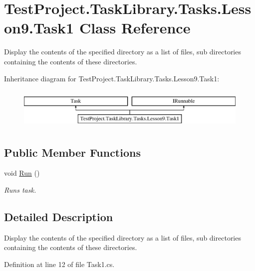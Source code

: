 \hypertarget{class_test_project_1_1_task_library_1_1_tasks_1_1_lesson9_1_1_task1}{}\section{Test\+Project.\+Task\+Library.\+Tasks.\+Lesson9.\+Task1 Class Reference}
\label{class_test_project_1_1_task_library_1_1_tasks_1_1_lesson9_1_1_task1}


Display the contents of the specified directory as a list of files, sub directories containing the contents of these directories.  


Inheritance diagram for Test\+Project.\+Task\+Library.\+Tasks.\+Lesson9.\+Task1\+:\begin{figure}[H]
\begin{center}
\leavevmode
\includegraphics[height=2.000000cm]{class_test_project_1_1_task_library_1_1_tasks_1_1_lesson9_1_1_task1}
\end{center}
\end{figure}
\subsection*{Public Member Functions}
\begin{DoxyCompactItemize}
\item 
void \mbox{\hyperlink{class_test_project_1_1_task_library_1_1_tasks_1_1_lesson9_1_1_task1_a9cd2b81018cab0a02a0f89a99e6d0dd1}{Run}} ()
\begin{DoxyCompactList}\small\item\em Runs task. \end{DoxyCompactList}\end{DoxyCompactItemize}


\subsection{Detailed Description}
Display the contents of the specified directory as a list of files, sub directories containing the contents of these directories. 



Definition at line 12 of file Task1.\+cs.



